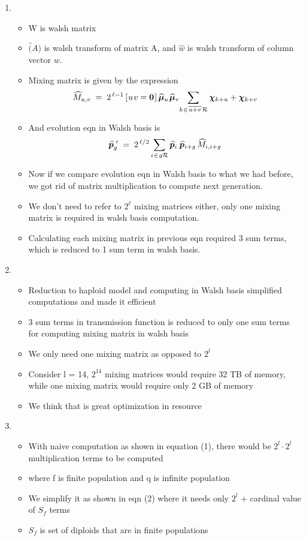 \documentclass{article}
\newcommand{\nudge}{\hspace{0.01in}}
\begin{document}
\begin{enumerate}
\item
  \begin{itemize}
  \item W is walsh matrix
  \item $\hat(A)$ is walsh transform of matrix A, 
    and $\hat{w}$ is walsh transform of column vector $w$.
  \item Mixing matrix is given by the expression
    \[
      \widehat{M}_{u,v} \; = \; 2^{\,\ell-1} \,[\nudge u \nudge v = {\bf
      0}\nudge]\, \widehat{\bm{\mu}}_u \nudge \widehat{\bm{\mu}}_v \!  \sum_{k
    \nudge \in \nudge \overline{u+v} \nudge \mathcal{R}} \bm{\chi}_{k + u} +
    \bm{\chi}_{k + v}
    \]
  \item And evolution eqn in Walsh basis is 
  \[
    \widehat{\bm{p}}_g^{\,\,\prime} \; = \; 2^{\,\ell/2} \sum_{i \nudge \in \nudge g \mathcal{R}}
    \widehat{\bm{p}}_i \, \nudge \widehat{\bm{p}}_{i+g} \,\widehat{M}_{i,i+g}
  \]
  \item Now if we compare evolution eqn in Walsh basis to what we had before, we got rid of matrix multiplication to compute next generation. 
  \item We don't need to refer to $2^\ell$ mixing matrices either, only one mixing matrix is required in walsh basis computation.
  \item Calculating each mixing matrix in previous eqn required 3 sum terms, which is reduced to 1 sum term in walsh basis.
  \end{itemize}
    
\item
  \begin{itemize}
  \item Reduction to haploid model and computing in Walsh basis
    simplified computations and made it efficient
  \item 3 sum terms in transmission function is reduced to only one sum terms for computing mixing matrix in walsh basis 
  \item We only need one mixing matrix as opposed to $2^l$
  \item Consider l = 14, $2^{14}$ mixing matrices would require 32 TB of
    memory, while one mixing matrix would require only 2 GB of memory
  \item We think that is great optimization in resource
  \end{itemize}
    
\item
  \begin{itemize}
  \item With naive computation as shown in equation (1), there would
    be $2^l \cdot 2^l$ multiplication terms to be computed
  \item where f is finite population and q is infinite population
  \item We simplify it as shown in eqn (2) where it needs only $2^l$ +
    cardinal value of $S_f$ terms
  \item $S_f$ is set of diploids that are in finite populations
  \end{itemize}
  

\end{enumerate}
\end{document}
